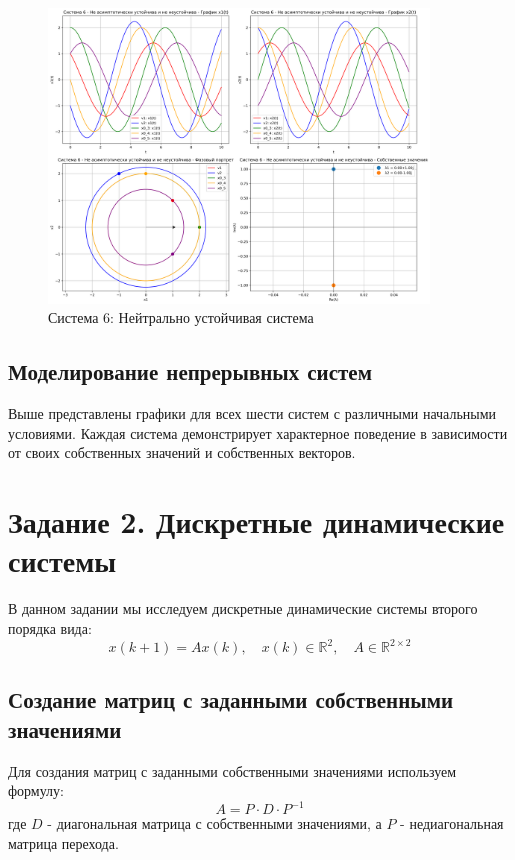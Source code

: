 \begin{figure}[h!]
\centering
\includegraphics[width=0.9\textwidth]{images/task1/система_6_-_не_асимптотически_устойчива_и_не_неустойчива.png}
\caption{Система 6: Нейтрально устойчивая система}
\label{fig:system6}
\end{figure}

\subsection{Моделирование непрерывных систем}

Выше представлены графики для всех шести систем с различными начальными условиями. Каждая система демонстрирует характерное поведение в зависимости от своих собственных значений и собственных векторов.

\section{Задание 2. Дискретные динамические системы}

В данном задании мы исследуем дискретные динамические системы второго порядка вида:
\begin{equation}
x(k+1) = Ax(k), \quad x(k) \in \mathbb{R}^2, \quad A \in \mathbb{R}^{2 \times 2}
\end{equation}

\subsection{Создание матриц с заданными собственными значениями}

Для создания матриц с заданными собственными значениями используем формулу:
\begin{equation}
A = P \cdot D \cdot P^{-1}
\end{equation}
где $D$ - диагональная матрица с собственными значениями, а $P$ - недиагональная матрица перехода.

